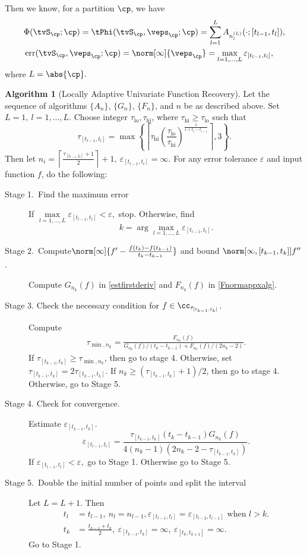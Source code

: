 \documentclass[]{elsarticle}
\DeclareMathOperator{\lo}{lo}
\DeclareMathOperator{\err}{err}
\theoremstyle{definition}
\newtheorem{algo}{Algorithm}
\theoremstyle{remark}
\begin{document}
Then we know, for a partition $\cp$, we have 
\begin{align*}
& \Phi(\tvS_{\cp};\cp) = \tPhi(\tvS_{\cp},\veps_{\cp};\cp) = \sum_{l=1}^L  A_{n_{l}^{(L)}}(\cdot; [t_{l-1},t_l]), \\
&\err(\tvS_{\cp},\veps_{\cp};\cp) = \norm[\infty]{\veps_{\cp}}=\max_{l=1,\ldots,L}\varepsilon_{[t_{l-1},t_l]},
\end{align*}
where $L=\abs{\cp}.$


\begin{algo}[Locally Adaptive Univariate Function Recovery] \label{multistageapproalgo}
Let the sequence of algorithms $\{A_n\}$, $\{G_n\}$,  $\{F_n\}$, and $n$  be as described above. Set $L=1, \ l =1,\ldots,L$.
Choose integer $\tau_{\lo}, \tau_{\text{hi}}$, where $\tau_{\text{hi}} \ge \tau_{\lo}$ such that
$$\tau_{[t_{l-1},t_l]} = \max\left\{ \left\lceil \tau_{\text{hi}} \left(\frac{\tau_{\lo}}{\tau_{\text{hi}}}\right)^{\frac{1}{1+t_i-t_{i-1}}} \right\rceil ,3\right\}.$$
Then let $n_i= \left\lceil\frac{\tau_{[t_{l-1},t_l]}+1}{2}  \right\rceil+1, \ \varepsilon_{[t_{l-1},t_l]}=\infty.$ For any error tolerance $\varepsilon$ and input function $f$, do the following:
\begin{description}
\item[Stage 1.\ Find the maximum error] If $\max\limits_{l=1,\ldots,L}\varepsilon_{[t_{l-1},t_l]} < \varepsilon,$ stop.
Otherwise, find
$$k = \arg\max\limits_{l=1,\ldots,L}\varepsilon_{[t_{l-1},t_l]}.$$
\item[Stage 2.\ Compute{$\norm[\infty]{f'-\frac{f(t_k)-f(t_{k-1})}{t_k-t_{k-1}}}$} and bound {$\norm[\infty,{[t_{k-1},t_k]}]{f''}$}.] Compute $G_{n_k}(f)$ in \eqref{estfirstderiv} and $F_{n_k}(f)$ in \eqref{Fnormappxalg}.
\item[Stage 3. Check the necessary condition for $f \in \cc_{\tau_{[t_{k-1},t_k]}}$.] Compute
    \begin{align*}
     \tau_{\min,n_k} =  \frac{F_{n_k}(f)}{G_{n_k}(f)/(t_k-t_{k-1})+F_{n_k}(f)/(2n_k-2)}.
    \end{align*}
If $\tau_{[t_{k-1},t_k]} \ge \tau_{\min,n_k}$, then go to stage 4.  Otherwise, set $\tau_{[t_{k-1},t_k]} = 2\tau_{[t_{k-1},t_k]}$.  If $n_k \ge (\tau_{[t_{k-1},t_k]}+1)/2$, then go to stage 4.  Otherwise, go to Stage 5.
\item[Stage 4. Check for convergence.] Estimate $\varepsilon_{[t_{k-1},t_k]}.$
$$\varepsilon_{[t_{l-1},t_l]}=\frac{\tau_{[t_{k-1},t_k]}(t_k-t_{k-1})G_{n_k}(f)}{4(n_k-1)(2n_k-2 - \tau_{[t_{k-1},t_k]})}.$$
If $\varepsilon_{[t_{l-1},t_l]} < \varepsilon ,$ go to Stage 1. Otherwise go to Stage 5.
\item[Stage 5.\ Double the initial number of points and split the interval]
Let $L=L+1.$ Then
\begin{align*}
t_l&=t_{l-1}, \ n_l=n_{l-1},  \varepsilon_{[t_{l-1},t_l]}=\varepsilon_{[t_{l-2},t_{l-1}]} \text{ when } l > k.\\
t_k&=\frac{t_{k-1}+t_k}{2}, \ \varepsilon_{[t_{k-1},t_k]}=\infty, \ \varepsilon_{[t_k,t_{k+1}]}=\infty.
\end{align*}
Go to Stage 1.
\end{description}
\end{algo}
\end{document}
